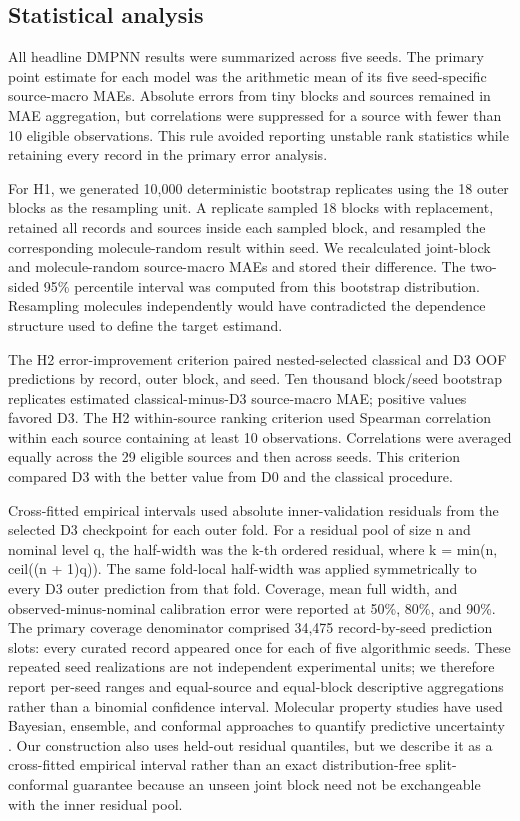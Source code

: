 \documentclass[referee,lineno,pdflatex,sn-vancouver-num]{sn-jnl}
\begin{document}
\subsection{Statistical analysis}

All headline DMPNN results were summarized across five seeds. The primary point estimate for each model was the arithmetic mean of its five seed-specific source-macro MAEs. Absolute errors from tiny blocks and sources remained in MAE aggregation, but correlations were suppressed for a source with fewer than 10 eligible observations. This rule avoided reporting unstable rank statistics while retaining every record in the primary error analysis.

For H1, we generated 10,000 deterministic bootstrap replicates using the 18 outer blocks as the resampling unit. A replicate sampled 18 blocks with replacement, retained all records and sources inside each sampled block, and resampled the corresponding molecule-random result within seed. We recalculated joint-block and molecule-random source-macro MAEs and stored their difference. The two-sided 95\% percentile interval was computed from this bootstrap distribution. Resampling molecules independently would have contradicted the dependence structure used to define the target estimand.

The H2 error-improvement criterion paired nested-selected classical and D3 OOF predictions by record, outer block, and seed. Ten thousand block/seed bootstrap replicates estimated classical-minus-D3 source-macro MAE; positive values favored D3. The H2 within-source ranking criterion used Spearman correlation within each source containing at least 10 observations. Correlations were averaged equally across the 29 eligible sources and then across seeds. This criterion compared D3 with the better value from D0 and the classical procedure.

Cross-fitted empirical intervals used absolute inner-validation residuals from the selected D3 checkpoint for each outer fold. For a residual pool of size n and nominal level q, the half-width was the k-th ordered residual, where k = min(n, ceil((n + 1)q)). The same fold-local half-width was applied symmetrically to every D3 outer prediction from that fold. Coverage, mean full width, and observed-minus-nominal calibration error were reported at 50\%, 80\%, and 90\%. The primary coverage denominator comprised 34,475 record-by-seed prediction slots: every curated record appeared once for each of five algorithmic seeds. These repeated seed realizations are not independent experimental units; we therefore report per-seed ranges and equal-source and equal-block descriptive aggregations rather than a binomial confidence interval. Molecular property studies have used Bayesian, ensemble, and conformal approaches to quantify predictive uncertainty \cite{zhang2019bayesian,hirschfeld2020uncertainty,li2024conformalized}. Our construction also uses held-out residual quantiles, but we describe it as a cross-fitted empirical interval rather than an exact distribution-free split-conformal guarantee because an unseen joint block need not be exchangeable with the inner residual pool.
\end{document}
